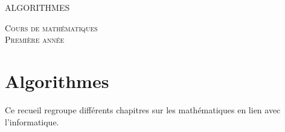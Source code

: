 
\pagestyle{empty}\thispagestyle{empty}
\vspace*{\fill}
\begin{center}
\fontsize{52}{52}\selectfont
\textsc{ALGORITHMES}
\end{center}
\vfill
\begin{center}
\huge
\textsc{Cours de mathématiques}\\ 
\textsc{Première année}
\end{center}

\begin{center}
\end{center}
\clearemptydoublepage
\thispagestyle{empty}

\vspace*{\fill}
\section*{Algorithmes}


Ce recueil regroupe différents chapitres sur les mathématiques en lien avec l'informatique.


\vspace*{\fill}

\newpage
{}
\tableofcontents

